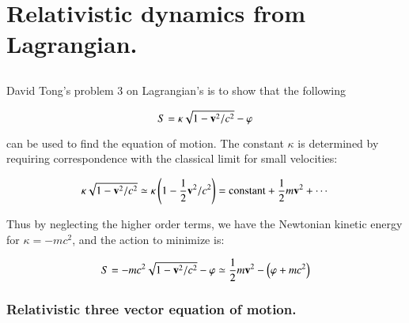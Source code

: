 
%
%
%

\chapter{Relativistic dynamics from Lagrangian. }
\label{chap:fvec}
\date{ June 10, 2008.  $RCSfile: fvec.tex,v $ Last $Revision: 1.12 $ $Date: 2009/06/14 23:51:45 $ }



\section{}

David Tong's problem 3 on Lagrangian's is to show that the following

\begin{equation}
S = \kappa \sqrt{1 - \mathbf{v}^2/c^2} - \varphi
\end{equation}

can be used to find the equation of motion.  The constant $\kappa$ is determined
by requiring correspondence with the classical limit for small velocities:

\begin{equation*}
\kappa \sqrt{1 - \mathbf{v}^2/c^2} \simeq \kappa \left( 1 - \frac{1}{2} \mathbf{v}^2/c^2 \right) = \text{constant} + \frac{1}{2} m \mathbf{v}^2 + \cdots
\end{equation*}

Thus by neglecting the higher order terms, we have the Newtonian kinetic energy for $\kappa = -mc^2$, and the action to minimize is:

\begin{equation}
S = -m c^2\sqrt{1 - \mathbf{v}^2/c^2} - \varphi \simeq \frac{1}{2}m \mathbf{v}^2 - \left(\varphi + m c^2\right)
\end{equation}

\subsection{Relativistic three vector equation of motion. }

